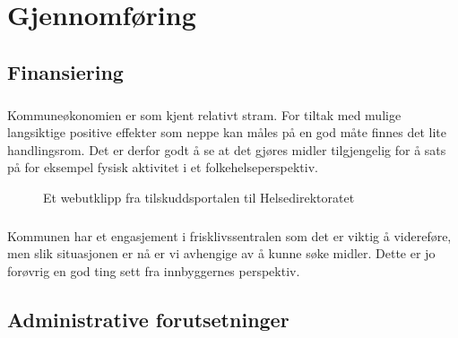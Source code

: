\documentclass[11pt]{memoir} %
\begin{document}
\chapter{Gjennomføring}
	\section{Finansiering}
		\paragraph{}
			Kommuneøkonomien er som kjent relativt stram. For tiltak med mulige langsiktige positive effekter som neppe kan måles på en god måte finnes det lite handlingsrom. Det er derfor godt å se at det gjøres midler tilgjengelig for å sats på for eksempel fysisk aktivitet i et folkehelseperspektiv\cite{faktfhfig}.
					\begin{figure}[h]
                      \centering
                    	  \captionsetup{singlelinecheck=off}
                      	\caption{Et webutklipp fra tilskuddsportalen til Helsedirektoratet}
                      	\label{faktfhfig}
                    \end{figure}   
        \paragraph{}
            Kommunen har et engasjement i frisklivssentralen som det er viktig å videreføre, men slik situasjonen er nå er vi avhengige av å kunne søke midler. Dette er jo forøvrig en god ting sett fra innbyggernes perspektiv.
	\section{Administrative forutsetninger}
\end{document}
